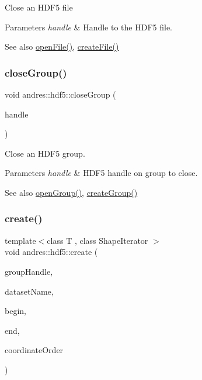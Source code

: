 Close an H\+D\+F5 file


\begin{DoxyParams}{Parameters}
{\em handle} & Handle to the H\+D\+F5 file.\\
\hline
\end{DoxyParams}
\begin{DoxySeeAlso}{See also}
\hyperlink{namespaceandres_1_1hdf5_a3645de3466468274059f8475066ff820}{open\+File()}, \hyperlink{namespaceandres_1_1hdf5_a1f779b6e42349512d5227fbb6dcf92cd}{create\+File()} 
\end{DoxySeeAlso}
\mbox{\label{namespaceandres_1_1hdf5_a1aaf506863ec820cdcc827c7997d4ba3}} 
\subsubsection{\texorpdfstring{close\+Group()}{closeGroup()}}
{\footnotesize\ttfamily void andres\+::hdf5\+::close\+Group (\begin{DoxyParamCaption}\item[{const hid\+\_\+t \&}]{handle }\end{DoxyParamCaption})\hspace{0.3cm}{\ttfamily [inline]}}

Close an H\+D\+F5 group.


\begin{DoxyParams}{Parameters}
{\em handle} & H\+D\+F5 handle on group to close.\\
\hline
\end{DoxyParams}
\begin{DoxySeeAlso}{See also}
\hyperlink{namespaceandres_1_1hdf5_a3d7159f65f86576c9142409b08afcfc9}{open\+Group()}, \hyperlink{namespaceandres_1_1hdf5_ac03dd5212231c5335a0a02edb3c0d879}{create\+Group()} 
\end{DoxySeeAlso}
\mbox{\label{namespaceandres_1_1hdf5_ad266faeb7371428b1bf018d4ddfec60d}} 
\subsubsection{\texorpdfstring{create()}{create()}}
{\footnotesize\ttfamily template$<$class T , class Shape\+Iterator $>$ \\
void andres\+::hdf5\+::create (\begin{DoxyParamCaption}\item[{const hid\+\_\+t \&}]{group\+Handle,  }\item[{const std\+::string \&}]{dataset\+Name,  }\item[{Shape\+Iterator}]{begin,  }\item[{Shape\+Iterator}]{end,  }\item[{\hyperlink{namespaceandres_a2ac8b7aa89d44e8188a7c0ba50f4306b}{Coordinate\+Order}}]{coordinate\+Order }\end{DoxyParamCaption})}

